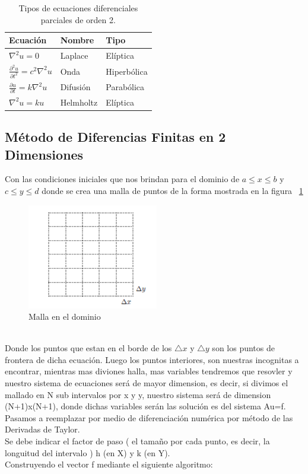 \documentclass[11pt,a4paper]{article}
\begin{document}
\begin{table}[htb]
\begin{center}
\begin{tabular}{|l|l|l|}
\hline
Ecuación & Nombre & Tipo \\
\hline \hline \hline
$\nabla^2 u=0$ & Laplace & Elíptica \\ \hline
$\frac{\partial^2u}{\partial t^2}=c^2 \nabla^2 u$ & Onda & Hiperbólica \\ \hline
$\frac{\partial u}{\partial t}=k \nabla^2 u$ & Difusión & Parabólica \\ \hline
$\nabla^2 u=ku$ & Helmholtz & Elíptica \\ \hline
\end{tabular}
\caption{Tipos de ecuaciones diferenciales parciales de orden 2.}
\label{tabla1}
\end{center}
\end{table}

\newpage
\subsection{Método de Diferencias Finitas en 2 Dimensiones}
\thispagestyle{empty}
Con las condiciones iniciales que nos brindan para el dominio de $ a \le x \le b $ y $ c\le y \le d$ donde se crea una malla de puntos de la forma mostrada en la figura ~\ref{figura1}\\
\begin{figure}[htbp]
\begin{center}
\includegraphics[scale=1.25]{img_1}
\caption{Malla en el dominio}
\label{figura1}
\end{center}
\end{figure}
\\
Donde los puntos que estan en el borde de los $\triangle x$ y $\triangle y$ son los puntos de frontera de dicha ecuación.
Luego los puntos interiores, son nuestras incognitas a encontrar, mientras mas diviones halla, mas variables tendremos que resovler y nuestro sistema de ecuaciones será de mayor dimension, es decir, si divimos el mallado en N sub intervalos por x y y, nuestro sistema será de dimension (N+1)x(N+1), donde dichas variables serán las solución es del sistema Au=f.\\
Pasamos a reemplazar por medio de diferenciación numérica por método de las Derivadas de Taylor.\\
Se debe indicar el factor de paso ( el tamaño por cada punto, es decir, la longuitud del intervalo ) h (en X) y k (en Y).\\
Construyendo el vector f mediante el siguiente algoritmo:\\
\end{document}
